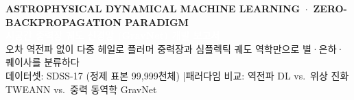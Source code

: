 \documentclass[11pt,a4paper]{article}
\begin{document}
\begin{tcolorbox}[
  enhanced,
  colback=NavyAccent,
  colframe=NavyAccent,
  arc=5pt,
  boxrule=0pt,
  top=16pt, bottom=16pt, left=18pt, right=18pt
]
  {\sffamily\bfseries\footnotesize\textcolor{SoftBlueBg!85!white}{ASTROPHYSICAL DYNAMICAL MACHINE LEARNING \,$\cdot$\, ZERO-BACKPROPAGATION PARADIGM}}\\[6pt]
  {\sffamily\bfseries\LARGE\textcolor{white}{시공간 중력장 궤도 신경망 (GravNet) 개발 보고서}}\\[6pt]
  {\sffamily\large\textcolor{SoftBlueBg}{오차 역전파 없이 다중 헤일로 플러머 중력장과 심플렉틱 궤도 역학만으로 별·은하·퀘이사를 분류하다}}\\[10pt]
  {\sffamily\footnotesize\textcolor{BorderGray}{데이터셋: SDSS-17 (정제 표본 99,999천체) \quad|\quad 패러다임 비교: 역전파 DL vs.\ 위상 진화 TWEANN vs.\ 중력 동역학 GravNet}}
\end{tcolorbox}

\vspace{4pt}
\end{document}
